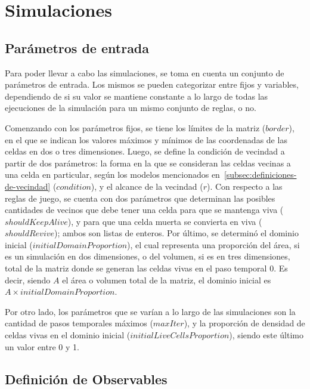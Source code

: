 \section{Simulaciones}\label{sec:simulaciones}

\subsection{Parámetros de entrada}\label{subsec:parametros-de-entrada}

Para poder llevar a cabo las simulaciones, se toma en cuenta un conjunto de parámetros de entrada.
Los mismos se pueden categorizar entre fijos y variables, dependiendo de si su valor se mantiene
constante a lo largo de todas las ejecuciones de la simulación para un mismo conjunto de reglas, o no.

Comenzando con los parámetros fijos, se tiene los límites de la matriz ($border$),
en el que se indican los valores máximos y mínimos de las coordenadas de las celdas en dos o tres dimensiones.
Luego, se define la condición de vecindad a partir de dos parámetros:
la forma en la que se consideran las celdas vecinas a una celda en particular, según los modelos mencionados
en~\ref{subsec:definiciones-de-vecindad} ($condition$), y el alcance de la vecindad ($r$).
Con respecto a las reglas de juego, se cuenta con dos parámetros que determinan las posibles cantidades de
vecinos que debe tener una celda para que se mantenga viva ($shouldKeepAlive$),
y para que una celda muerta se convierta en viva ($shouldRevive$); ambos son listas de enteros.
Por último, se determinó el dominio inicial ($initialDomainProportion$), el
cual representa una proporción del área, si es un simulación en dos dimensiones, o del volumen,
si es en tres dimensiones, total de la matriz donde se generan las celdas vivas en el paso temporal 0.
Es decir, siendo $A$ el área o volumen total de la matriz, el dominio inicial es $A \times initialDomainProportion$.

Por otro lado, los parámetros que se varían a lo largo de las simulaciones son la cantidad de pasos temporales
máximos ($maxIter$), y la proporción de densidad de celdas vivas en el dominio inicial ($initialLiveCellsProportion$),
siendo este último un valor entre 0 y 1.

\subsection{Definición de Observables}\label{subsec:observables-posibles}

